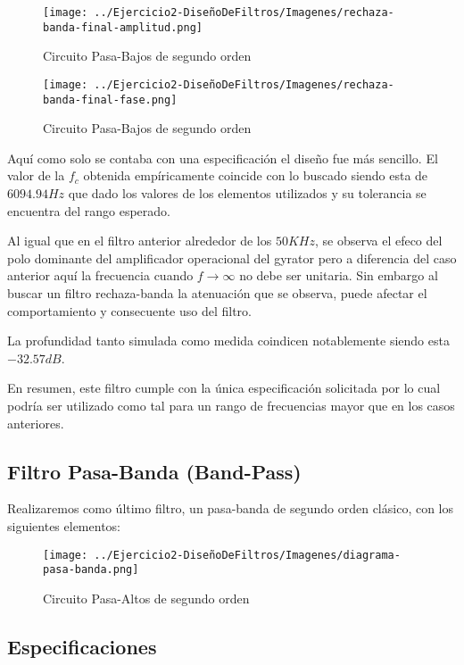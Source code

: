 \begin{figure}[H]
    \centering
    \texttt{[image: ../Ejercicio2-DiseñoDeFiltros/Imagenes/rechaza-banda-final-amplitud.png]}
    \caption{Circuito Pasa-Bajos de segundo orden}
\end{figure}

\begin{figure}[H]
    \centering
    \texttt{[image: ../Ejercicio2-DiseñoDeFiltros/Imagenes/rechaza-banda-final-fase.png]}
    \caption{Circuito Pasa-Bajos de segundo orden}
\end{figure}

Aquí como solo se contaba con una especificación el diseño fue más sencillo. El valor de la $f_c$ obtenida empíricamente coincide con lo buscado
siendo esta de $6094.94 Hz$ que dado los valores de los elementos utilizados y su tolerancia se encuentra del rango esperado.

Al igual que en el filtro anterior alrededor de los $50KHz$, se observa el efeco del polo dominante del amplificador operacional del gyrator pero a diferencia
del caso anterior aquí la frecuencia cuando $f \to \infty$ no debe ser unitaria. Sin embargo al buscar un filtro rechaza-banda la atenuación que se observa, puede
afectar el comportamiento y consecuente uso del filtro. 

La profundidad tanto simulada como medida coindicen notablemente siendo esta $-32.57 dB$.

En resumen, este filtro cumple con la única especificación solicitada por lo cual podría ser utilizado como tal para un rango
de frecuencias mayor que en los casos anteriores.

\subsection{Filtro Pasa-Banda (Band-Pass)}

Realizaremos como último filtro, un pasa-banda de segundo orden clásico, con los siguientes elementos:

\begin{figure}[H]
    \centering
    \texttt{[image: ../Ejercicio2-DiseñoDeFiltros/Imagenes/diagrama-pasa-banda.png]}
    \caption{Circuito Pasa-Altos de segundo orden}
\end{figure}

\subsection{Especificaciones}

